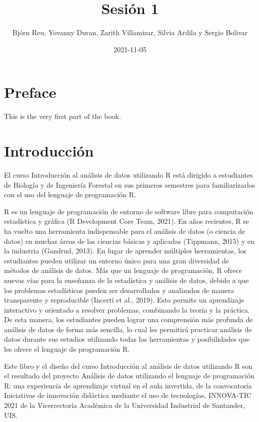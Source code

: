 \documentclass[
]{book}
\title{Sesión 1}
\author{Björn Reu, Yovanny Duran, Zarith Villamizar, Silvia Ardila y Sergio Bolivar}
\date{2021-11-05}
\begin{document}
\maketitle

{
\setcounter{tocdepth}{1}
\tableofcontents
}
\hypertarget{preface}{%
\chapter*{Preface}\label{preface}}

This is the very first part of the book.

\hypertarget{introducciuxf3n}{%
\chapter{Introducción}\label{introducciuxf3n}}

El curso Introducción al análisis de datos utilizando R está dirigido a estudiantes de Biología y de Ingeniería Forestal en sus primeros semestres para familiarizarlos con el uso del lenguaje de programación R.

R es un lenguaje de programación de entorno de software libre para computación estadística y gráfica (R Development Core Team, 2021). En años recientes, R se ha vuelto una herramienta indispensable para el análisis de datos (o ciencia de datos) en muchas áreas de las ciencias básicas y aplicadas (Tippmann, 2015) y en la industria (Gandrud, 2013). En lugar de aprender múltiples herramientas, los estudiantes pueden utilizar un entorno único para una gran diversidad de métodos de análisis de datos. Más que un lenguaje de programación, R ofrece nuevas vías para la enseñanza de la estadística y análisis de datos, debido a que los problemas estadísticos pueden ser desarrollados y analizados de manera transparente y reproducible (Incerti et al., 2019). Esto permite un aprendizaje interactivo y orientado a resolver problemas, combinando la teoría y la práctica. De esta manera, los estudiantes pueden lograr una comprensión más profunda de análisis de datos de forma más sencilla, lo cual les permitirá practicar análisis de datos durante sus estudios utilizando todas las herramientas y posibilidades que les ofrece el lenguaje de programación R.

Este libro y el diseño del curso Introducción al análisis de datos utilizando R son el resultado del proyecto Análisis de datos utilizando el lenguaje de programación R: una experiencia de aprendizaje virtual en el aula invertida, de la convocatoría Iniciativas de innovación didáctica mediante el uso de tecnologías, INNOVA-TIC 2021 de la Vicerrectoría Académica de la Universidad Industrial de Santander, UIS.
\end{document}
